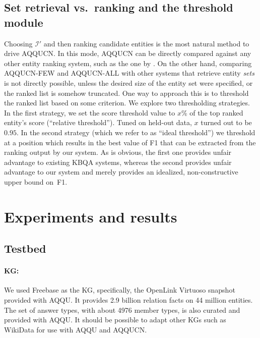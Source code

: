 \documentclass{svjour3}
\begin{document}
\subsection{Set retrieval vs.\ ranking and the threshold module}
\label{sec:setvsrank}

Choosing $\mathcal{I}'$ and then ranking candidate entities is the most natural method to drive AQQUCN.  In this mode, AQQUCN can be directly compared against any other entity ranking system, such as the one by \citet{JoshiSC2014KgCorpusJoint}.  On the other hand, comparing AQQUCN-FEW and AQQUCN-ALL with other systems that retrieve entity \emph{sets} is not directly possible, unless the desired size of the entity set were  specified, or the ranked list is somehow truncated.  One way to approach this is to threshold the ranked list based on some criterion.  We explore two thresholding strategies.  In the first strategy, we set the score threshold value to $x$\% of the top ranked entity's score (``relative threshold'').  Tuned on held-out data, $x$ turned out to be $0.95$.  In the second strategy (which we refer to as ``ideal threshold'') we threshold at a position which results in the best value of F1 that can be extracted from the ranking output by our system.  As is obvious, the first one provides  unfair advantage to existing KBQA systems, whereas the second provides unfair advantage to our system and merely provides an idealized, non-constructive upper bound on~F1.



\section{Experiments and results}
\label{sec:results}

\subsection{Testbed}
\paragraph{KG:}  We used Freebase \citep{BollackerEPST2008Freebase} as the KG, specifically, the OpenLink Virtuoso snapshot provided with AQQU.  It provides 2.9 billion relation facts on 44 million entities.  The set of answer types, with about 4976 member types, is also curated and provided with AQQU.  It should be possible to adapt other KGs such as WikiData for use with AQQU and AQQUCN.
\end{document}
